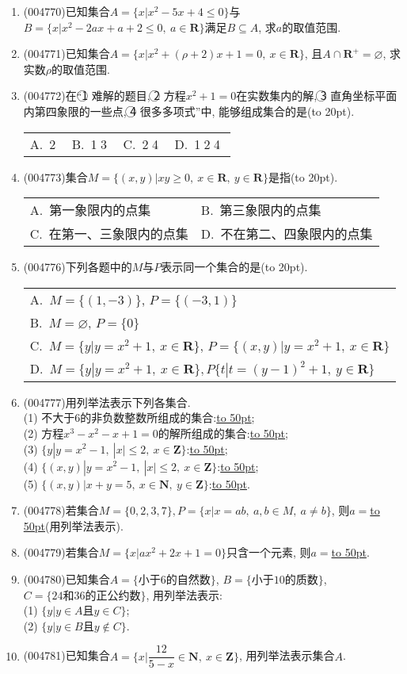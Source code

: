 \documentclass[10pt,a4paper]{article}
\newcommand{\blank}[1]{\underline{\hbox to #1pt{}}}
\newcommand{\bracket}[1]{(\hbox to #1pt{})}
\newcommand{\onech}[4]{\par\begin{tabular}{p{.9\textwidth}}
A.~#1\\
B.~#2\\
C.~#3\\
D.~#4
\end{tabular}}
\newcommand{\twoch}[4]{\par\begin{tabular}{p{.46\textwidth}p{.46\textwidth}}
A.~#1& B.~#2\\
C.~#3& D.~#4
\end{tabular}}
\newcommand{\fourch}[4]{\par\begin{tabular}{p{.23\textwidth}p{.23\textwidth}p{.23\textwidth}p{.23\textwidth}}
A.~#1 &B.~#2& C.~#3& D.~#4
\end{tabular}}
\begin{document}
\begin{enumerate}[1.]
\item {\tiny (004770)}已知集合$A=\{x|x^2-5x+4\le 0\}$与$B=\{x|x^2-2ax+a+2\le 0,\ a\in \mathbf{R}\}$满足$B\subseteq A$, 求$a$的取值范围.
\item {\tiny (004771)}已知集合$A=\{x|x^2 +(\rho +2)x+1=0, \ x\in \mathbf{R}\}$, 且$A\cap \mathbf{R}^+=\varnothing$, 求实数$\rho$的取值范围.
\item {\tiny (004772)}在``\textcircled{1} 难解的题目, \textcircled{2} 方程$x^2+1=0$在实数集内的解, \textcircled{3} 直角坐标平面内第四象限的一些点, \textcircled{4} 很多多项式''中, 能够组成集合的是\bracket{20}.
\fourch{\textcircled{2}}{\textcircled{1}\textcircled{3}}{\textcircled{2}\textcircled{4}}{\textcircled{1}\textcircled{2}\textcircled{4}}
\item {\tiny (004773)}集合$M=\{(x,y)|xy\ge 0,\ x\in \mathbf{R},\ y\in \mathbf{R}\}$是指\bracket{20}.
\twoch{第一象限内的点集}{第三象限内的点集}{在第一、三象限内的点集}{不在第二、四象限内的点集}
\item {\tiny (004776)}下列各题中的$M$与$P$表示同一个集合的是\bracket{20}.
\onech{$M=\{(1,-3)\}$, $P=\{(-3,1)\}$}{$M=\varnothing$, $P=\{0\}$}{$M=\{y|y=x^2+1, \ x\in \mathbf{R}\}$, $P=\{(x,y)|y=x^2+1, \ x\in \mathbf{R}\}$}{$M=\{y|y=x^2+1,\ x\in \mathbf{R}\},P\{t|t=(y-1)^2+1, \ y\in \mathbf{R}\}$}
\item {\tiny (004777)}用列举法表示下列各集合.\\
(1) 不大于$6$的非负数整数所组成的集合:\blank{50};\\
(2) 方程$x^3-x^2-x+1=0$的解所组成的集合:\blank{50};\\
(3) $\{y|y=x^2-1, \ |x|\le 2, \ x\in \mathbf{Z}\}$:\blank{50};\\
(4) $\{(x,y)|y =x^2-1, \  |x|\le 2,\ x\in \mathbf{Z}\}$:\blank{50};\\
(5) $\{(x,y)|x+y=5, \ x\in \mathbf{N},\ y\in \mathbf{Z}\}$:\blank{50}.
\item {\tiny (004778)}若集合$M=\{0,2,3,7\},P=\{x|x=ab, \ a,b\in M, \ a\ne b\}$, 则$a=$\blank{50}(用列举法表示).
\item {\tiny (004779)}若集合$M=\{x|ax^2+2x+1=0\}$只含一个元素, 则$a=$\blank{50}.
\item {\tiny (004780)}已知集合$A=\{\text{小于}6\text{的自然数}\}$, $B=\{\text{小于}10\text{的质数}\}$, $C=\{24\text{和}36\text{的正公约数}\}$, 用列举法表示:\\
(1) $\{y|y\in A\text{且}y\in C\}$;\\
(2) $\{y|y\in B\text{且}y\notin C\}$.
\item {\tiny (004781)}已知集合$A=\{x|\dfrac{12}{5-x}\in \mathbf{N},\ x\in\mathbf{Z}\}$, 用列举法表示集合$A$.

\end{enumerate}
\end{document}
